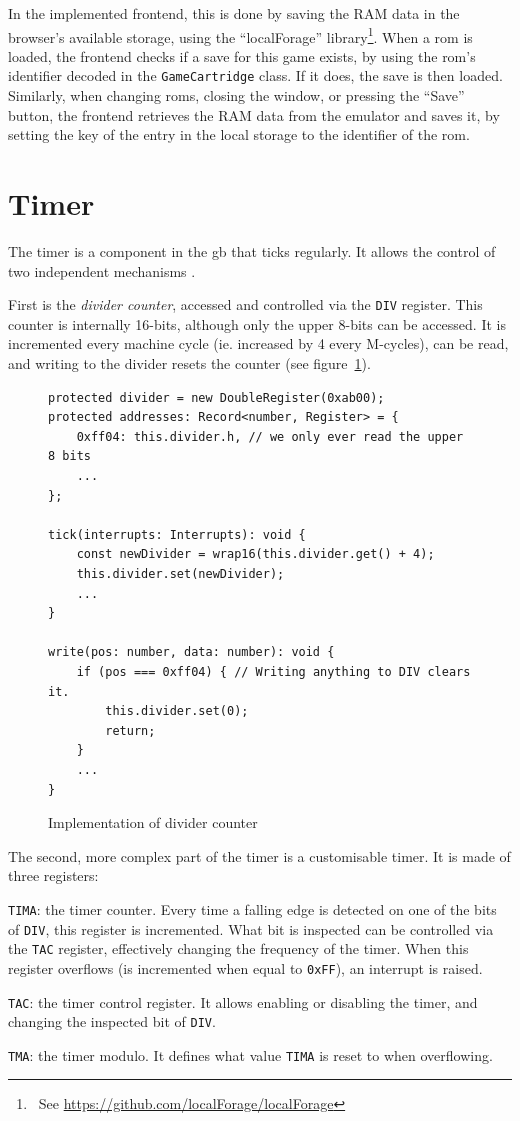 \documentclass[11pt]{informatics-report}
\newcommand{\ftnt}[1]{\footnote{~See \url{#1}}}
\begin{document}
In the implemented frontend, this is done by saving the RAM data in the browser's available storage, using the ``localForage'' library\ftnt{https://github.com/localForage/localForage}. When a \gls{rom} is loaded, the frontend checks if a save for this game exists, by using the \gls{rom}'s identifier decoded in the \texttt{GameCartridge} class. If it does, the save is then loaded. Similarly, when changing \glspl{rom}, closing the window, or pressing the ``Save'' button, the frontend retrieves the RAM data from the emulator and saves it, by setting the key of the entry in the local storage to the identifier of the \gls{rom}.

\section{Timer}

The timer is a component in the \gls{gb} that ticks regularly. It allows the control of two independent mechanisms \cite[Timer and Divider Registers]{pandoc}.

First is the \textit{divider counter}, accessed and controlled via the \texttt{DIV} register. This counter is internally 16-bits, although only the upper 8-bits can be accessed. It is incremented every machine cycle (ie. increased by 4 every M-cycles), can be read, and writing to the divider resets the counter (see figure~\ref{fig:div-timer}).

\begin{figure}[h]
    \begin{verbatim}
protected divider = new DoubleRegister(0xab00);
protected addresses: Record<number, Register> = {
	0xff04: this.divider.h, // we only ever read the upper 8 bits
	...
};

tick(interrupts: Interrupts): void {
	const newDivider = wrap16(this.divider.get() + 4);
	this.divider.set(newDivider);
	...
}

write(pos: number, data: number): void {
    if (pos === 0xff04) { // Writing anything to DIV clears it.
        this.divider.set(0);
        return;
    }
    ...
}
    \end{verbatim}
    \caption{Implementation of divider counter}
    \label{fig:div-timer}
\end{figure}

The second, more complex part of the timer is a customisable timer. It is made of three registers:
\begin{compactitem}
	\item \texttt{TIMA}: the timer counter.  Every time a falling edge is detected on one of the bits of \texttt{DIV}, this register is incremented. What bit is inspected can be controlled via the \texttt{TAC} register, effectively changing the frequency of the timer. When this register overflows (is incremented when equal to \texttt{0xFF}), an interrupt is raised.
	\item \texttt{TAC}: the timer control register. It allows enabling or disabling the timer, and changing the inspected bit of \texttt{DIV}.
	\item \texttt{TMA}: the timer modulo. It defines what value \texttt{TIMA} is reset to when overflowing.
\end{compactitem}
\end{document}
